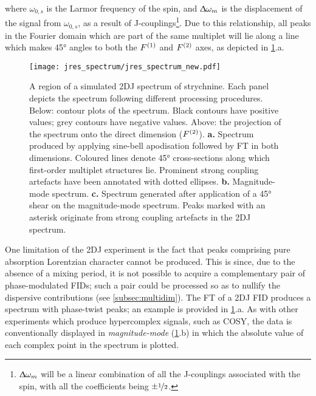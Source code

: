 where $\omega_{0,s}$ is the Larmor frequency of
the spin, and $\Updelta \omega_m$ is the displacement
of the signal from $\omega_{0,s}$, as a result of J-couplings\footnote{
    $\Updelta \omega_m$ will be a linear combination of all the J-couplings
    associated with the spin, with all the coefficients being $\pm
    \nicefrac{1}{2}$.
}. Due to this relationship, all peaks in the Fourier domain which are part of
the same multiplet will lie along a line which makes \ang{45} angles to both
the $F^{(1)}$ and $F^{(2)}$ axes, as depicted in \cref{fig:jres-spectrum}.a.
\begin{figure}%
    \centering%
    \texttt{[image: jres\_spectrum/jres\_spectrum\_new.pdf]}%
    \caption[
        A region of a \acs{2DJ} spectrum of strychnine, processed in different
        ways.
    ]
    {%
        A region of a simulated \acs{2DJ} spectrum of strychnine.
        Each panel depicts the spectrum following different processing
        procedures. Below: contour plots of the spectrum.
        Black contours have positive values; grey contours have negative
        values.
        Above: the projection of the spectrum onto the direct dimension ($F^{(2)}$).
        \textbf{a.} Spectrum produced by applying sine-bell apodisation
        followed by \ac{FT} in both dimensions.
        Coloured lines denote \ang{45} cross-sections along which first-order
        multiplet structures lie.
        Prominent strong coupling artefacts have been annotated with dotted
        ellipses.
        \textbf{b.} Magnitude-mode spectrum.
        \textbf{c.} Spectrum generated after application of a \ang{45} shear on
        the magnitude-mode spectrum. Peaks marked with an asterisk originate
        from strong coupling artefacts in the \ac{2DJ} spectrum.
   }%
    \label{fig:jres-spectrum}%
\end{figure}%

One limitation of the \ac{2DJ} experiment is the fact that peaks comprising
pure absorption Lorentzian character cannot be produced. This is since, due
to the absence of a mixing period, it is not possible to acquire a
complementary pair of phase-modulated \acp{FID}; such a pair could be processed
so as to nullify the dispersive contributions (see \cref{subsec:multidim}).
The FT of a \ac{2DJ} \ac{FID} produces a spectrum with phase-twist
peaks; an example is provided in \cref{fig:jres-spectrum}.a. As with
other experiments which produce hypercomplex signals, such as \ac{COSY}, the
data is conventionally displayed in \emph{magnitude-mode}
(\cref{fig:jres-spectrum}.b) in which the absolute value of each complex point
in the spectrum is plotted.

